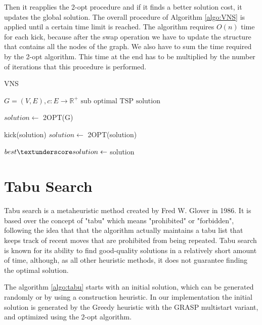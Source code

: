 Then it reapplies the 2-opt procedure and if it finds a better solution cost, it updates the global solution.
The overall procedure of Algorithm \ref{algo:VNS} is applied until a certain time limit is reached.
The algorithm requires $O(n)$ time for each kick, because after the swap operation we have to update the structure that contains all the nodes of the graph. We also have to sum the time required by the 2-opt algorithm. This time at the end has to be multiplied by the number of iterations that this procedure is performed. 

\begin{algorithm}[h!]
    \caption{VNS}\label{algo:VNS}
    \begin{algorithmic}[1]
    \Require $G = (V,E), c:E \to \mathbb{R}^+$
    \Ensure $\text{sub optimal TSP solution}$


    \State $solution \gets$ 2OPT(G)
   
   
    \State kick(solution)   
    \State $ solution \gets $ 2OPT(solution)
    
    
    \State $ best\textunderscore solution \gets$ solution
    \EndIf
    

    \EndWhile

    \end{algorithmic}
\end{algorithm}





\section{Tabu Search}
Tabu search is a metaheuristic method created by Fred W. Glover in 1986.
It is based over the concept of "tabu" which means "prohibited" or "forbidden", following the idea that that the algorithm actually maintains a tabu list that keeps track of recent moves that are prohibited from being repeated. 
Tabu search is known for its ability to find good-quality solutions in a relatively short amount of time, although, as all other heuristic methods, it does not guarantee finding the optimal solution.

The algorithm \ref{algo:tabu} starts with an initial solution, which can be generated randomly or by using a construction heuristic. In our implementation the initial solution is generated by the Greedy heuristic with the GRASP multistart variant, and optimized using the 2-opt algorithm.

